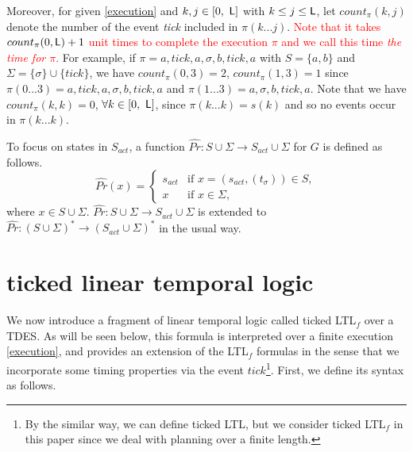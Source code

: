 \documentclass[journal,twoside,web]{IEEEtran}
\newcommand{\req}[1]{\eqref{#1}}
\renewcommand{\Pr}{\widehat{Pr}}
\newcommand{\Len}{{\sf L}}
\newcommand{\red}[1]{\textcolor{red}{#1}}
\begin{document}
Moreover, for given \req{execution} and $k, j\in [0,\ \Len]$ with $k \leq j \leq \Len$, let $count_\pi(k,j)$ denote the number of the event \textit{tick} included in $\pi(k...j)$.
\red{Note that it takes $count_{\pi}(0, {\Len})+1$ unit times to complete the execution $\pi$ and we call this time \textit{the time for $\pi$}.}
%
For example, if $\pi=a,\textit{tick},a,\sigma,b,\textit{tick},a$ with $S=\{a,b\}$ and $\Sigma = \{\sigma\}\cup \{\textit{tick}\}$, we have $count_\pi(0,3) = 2$, $count_\pi (1, 3) = 1$ since $\pi(0...3) = a,\textit{tick},a,\sigma,b,\textit{tick},a$ and $\pi(1...3) = a,\sigma,b,\textit{tick},a$. Note that we have $count_\pi(k, k)=0$, $\forall k \in [ 0, \ \Len ]$, since $\pi(k...k) = s(k)$ and so no events occur in $\pi(k...k)$.
%
%

To focus on states in $S_{act}$, a function $\Pr: S \cup \Sigma \to S_{act} \cup \Sigma $ for $G$ is defined as follows.
\label{def:Pr}
\[
\Pr (x )=\left\{
\begin{array}{ll}
s_{act} & \mbox{if }x =(s_{act}, (t_{\sigma})) \in S,  \\ 
x  & \mbox{if } x \in \Sigma , 
\end{array} \right.
\]
where $x  \in S  \cup \Sigma $. 
$\Pr : S \cup \Sigma \to S_{act} \cup \Sigma$ is extended to $\Pr : (S  \cup \Sigma )^* \to  (S_{act} \cup \Sigma )^*$ in the usual way.
%
%
\section{ticked linear temporal logic}
We now introduce a fragment of linear temporal logic called ticked LTL$_f$ over a TDES\cite{KHU2020}.
As will be seen below, this formula is interpreted over a finite execution \req{execution}, and provides an extension of the LTL$_f$ formulas\cite{Zhu2017} in the sense that we incorporate some timing properties via the event ${\textit{tick}}$\footnote{By the similar way, we can define ticked LTL, but we consider ticked LTL$_{f}$ in this paper since we deal with planning over a finite length.}.
First, we define its syntax as follows.
\end{document}
